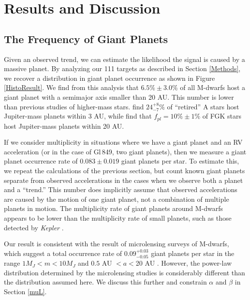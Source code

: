 \section{Results and Discussion}
\label{Results}
\subsection{The Frequency of Giant Planets}
\label{R1}

Given an observed trend, we can estimate the likelihood the signal is caused by a massive planet. By analyzing our 111 targets as described in Section \ref{Methods}, we recover a distribution in giant planet occurrence as shown in Figure \ref{HistoResult}. We find from this analysis that $6.5\% \pm 3.0\%$ of all M-dwarfs host a giant planet with a semimajor axis smaller than 20 AU. This number is lower than previous studies of higher-mass stars. \citet{Bowler10} find $24^{+8}_{-7}\%$ of ``retired'' A stars host Jupiter-mass planets within 3 AU, while \citet{Cumming08} find that $f_{pl} = 10\% \pm 1\%$ of FGK stars host Jupiter-mass planets within 20 AU. 

If we consider multiplicity in situations where we have a giant planet and an RV acceleration (or in the case of Gl\,849, two giant planets), then we measure a giant planet occurrence rate of $0.083 \pm 0.019$ giant planets per star. To estimate this, we repeat the calculations of the previous section, but count known giant planets separate from observed accelerations in the cases when we observe both a planet and a ``trend.'' This number does implicitly assume that observed accelerations are caused by the motion of one giant planet, not a combination of multiple planets in motion. The multiplicity rate of giant planets around M-dwarfs appears to be lower than the multiplicity rate of small planets, such as those detected by \textit{Kepler} \citep{Youdin11}.

Our result is consistent with the result of microlensing surveys of M-dwarfs, which suggest a total occurrence rate of $0.09^{+0.03}_{-0.05}$ giant planets per star in the range $1 M_J < m < 10 M_J$ and $0.5$ AU $< a < $20 AU \citet{Cassan12}. However, the power-law distribution determined by the microlensing studies is considerably different than the \citet{Cumming08} distribution assumed here. We discuss this further and constrain $\alpha$ and $\beta$ in Section \ref{muL}.


